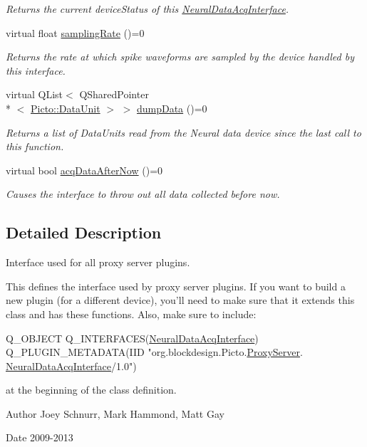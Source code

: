 \begin{DoxyCompactItemize}
\begin{DoxyCompactList}\small\item\em Returns the current device\-Status of this \hyperlink{class_neural_data_acq_interface}{Neural\-Data\-Acq\-Interface}. \end{DoxyCompactList}\item 
\hypertarget{class_neural_data_acq_interface_ab5de05e0b1bd90ac37d0fd7e317e85e3}{virtual float \hyperlink{class_neural_data_acq_interface_ab5de05e0b1bd90ac37d0fd7e317e85e3}{sampling\-Rate} ()=0}\label{class_neural_data_acq_interface_ab5de05e0b1bd90ac37d0fd7e317e85e3}

\begin{DoxyCompactList}\small\item\em Returns the rate at which spike waveforms are sampled by the device handled by this interface. \end{DoxyCompactList}\item 
virtual Q\-List$<$ Q\-Shared\-Pointer\\*
$<$ \hyperlink{class_picto_1_1_data_unit}{Picto\-::\-Data\-Unit} $>$ $>$ \hyperlink{class_neural_data_acq_interface_a5726ef21daaedd9947640b146e554c97}{dump\-Data} ()=0
\begin{DoxyCompactList}\small\item\em Returns a list of Data\-Units read from the Neural data device since the last call to this function. \end{DoxyCompactList}\item 
virtual bool \hyperlink{class_neural_data_acq_interface_ae2a18728d2a56fe1a65a66e10a33282f}{acq\-Data\-After\-Now} ()=0
\begin{DoxyCompactList}\small\item\em Causes the interface to throw out all data collected before now. \end{DoxyCompactList}\end{DoxyCompactItemize}


\subsection{Detailed Description}
Interface used for all proxy server plugins. 

This defines the interface used by proxy server plugins. If you want to build a new plugin (for a different device), you'll need to make sure that it extends this class and has these functions. Also, make sure to include\-: 
\begin{DoxyCode}
Q\_OBJECT
Q\_INTERFACES(\hyperlink{class_neural_data_acq_interface}{NeuralDataAcqInterface})
Q\_PLUGIN\_METADATA(IID "org.blockdesign.Picto.\hyperlink{class_proxy_server}{ProxyServer}.
      \hyperlink{class_neural_data_acq_interface}{NeuralDataAcqInterface}/1.0")
\end{DoxyCode}
 at the beginning of the class definition. \begin{DoxyAuthor}{Author}
Joey Schnurr, Mark Hammond, Matt Gay 
\end{DoxyAuthor}
\begin{DoxyDate}{Date}
2009-\/2013 
\end{DoxyDate}


